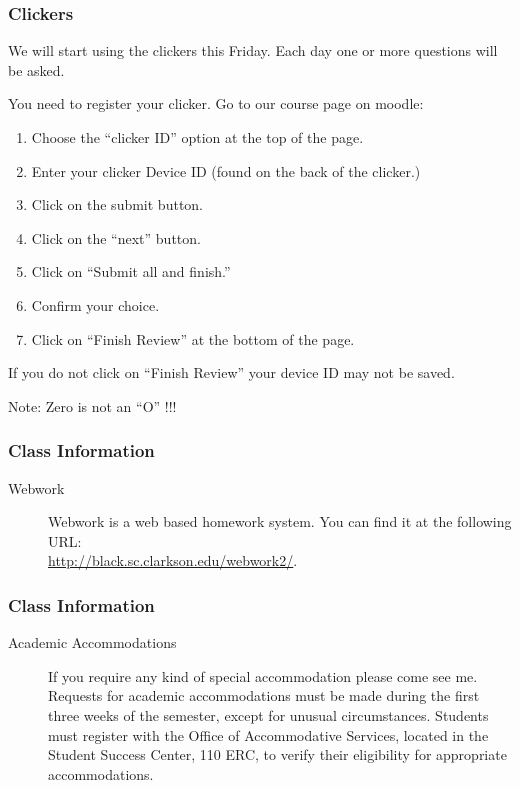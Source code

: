 \begin{frame}
  \frametitle{Clickers}

  We will start using the clickers this Friday. Each day one or more
  questions will be asked.

  You need to register your clicker. Go to our course page on moodle:
  \begin{enumerate}
  \item Choose the ``clicker ID'' option at the top of the page.
  \item Enter your clicker Device ID (found on the back of the
    clicker.)
  \item Click on the submit button.
  \item Click on the ``next'' button.
  \item Click on ``Submit all and finish.''
  \item Confirm your choice.
  \item Click on ``Finish Review'' at the bottom of the page.
  \end{enumerate}

  If you do not click on ``Finish Review'' your device ID may not be saved.

  Note: Zero is not an ``O''  !!!
  
\end{frame}


\begin{frame}
  \frametitle{Class Information}

\begin{description}
  \item[Webwork] Webwork is a web based homework system. You can find
    it at the following URL: \\
    \url{http://black.sc.clarkson.edu/webwork2/}.
\end{description}

\end{frame}


\begin{frame}
  \frametitle{Class Information}

\begin{description}
  \item[Academic Accommodations] If you require any kind of special
    accommodation please come see me.  Requests for academic
    accommodations must be made during the first three weeks of the
    semester, except for unusual circumstances.  Students must
    register with the Office of Accommodative Services, located in the
    Student Success Center, 110 ERC, to verify their eligibility for
    appropriate accommodations.


\end{description}


\end{frame}

